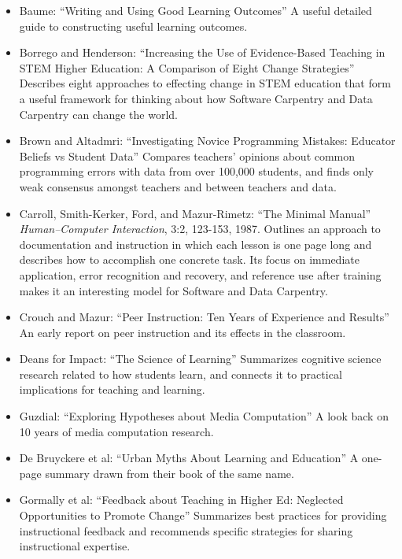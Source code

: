 \begin{itemize}

\item
  Baume:
``Writing and Using Good Learning Outcomes''
A useful detailed guide to constructing useful learning outcomes.

\item
  Borrego and Henderson:
``Increasing the Use of Evidence-Based Teaching in STEM Higher Education: A Comparison of Eight Change Strategies''
Describes eight approaches to effecting change in STEM education that
form a useful framework for thinking about how Software Carpentry and
Data Carpentry can change the world.

\item
  Brown and Altadmri:
``Investigating Novice Programming Mistakes: Educator Beliefs vs Student Data''
Compares teachers' opinions about common programming errors with data
from over 100,000 students, and finds only weak consensus amongst
teachers and between teachers and data.

\item
  Carroll, Smith-Kerker, Ford, and Mazur-Rimetz:
``The Minimal Manual'' \emph{Human--Computer Interaction}, 3:2, 123-153, 1987.
Outlines an approach to documentation and instruction in which each
lesson is one page long and describes how to accomplish one concrete
task. Its focus on immediate application, error recognition and
recovery, and reference use after training makes it an interesting model
for Software and Data Carpentry.

\item
  Crouch and Mazur:
``Peer Instruction: Ten Years of Experience and Results''
An early report on peer instruction and its effects in the classroom.

\item
  Deans for Impact:
``The Science of Learning''
Summarizes cognitive science research related to how students learn, and
connects it to practical implications for teaching and learning.

\item
  Guzdial:
``Exploring Hypotheses about Media Computation''
A look back on 10 years of media computation research.

\item
  De Bruyckere et al:
``Urban Myths About Learning and Education''
A one-page summary drawn from their book of the same name.

\item
  Gormally et al:
``Feedback about Teaching in Higher Ed: Neglected Opportunities to Promote Change''
Summarizes best practices for providing instructional feedback and
recommends specific strategies for sharing instructional expertise.


\end{itemize}
